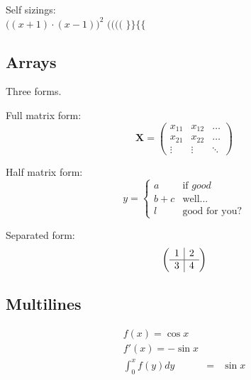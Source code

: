 \documentclass[12pt, oneside]{article}
\begin{document}
Self sizings: \\
$\Big( (x+1) \cdot (x-1) \Big)^{2}$ \qquad
$\big( \Big( \bigg( \Bigg($ \qquad
$\big\} \Big\} \bigg\{ \Bigg\{$ \qquad



\subsection{Arrays}
Three forms.

Full matrix form:
\begin{displaymath}
\mathbf{X} =
\left( \begin{array}{ccc} %
x_{11} & x_{12} & \ldots \\
x_{21} & x_{22} & \ldots \\
\vdots  & \vdots & \ddots
\end{array} \right) %
\end{displaymath}

Half matrix form:
\begin{displaymath}
y = \left\{ \begin{array}{cc} %
 a     & \textrm{if $good$} \\
 b+c & \textrm{well...}       \\
 l      & \textrm{good for you?}
\end{array} \right. %
\end{displaymath}

Separated form:
\begin{displaymath}
\left( \begin{array}{c | c}
1 & 2 \\
\hline
3 & 4 
\end{array} \right) 
\end{displaymath}



\subsection{Multilines}
\begin{eqnarray} 
f(x) = \cos x  \\
f'(x) = -\sin x \\
\int_{0}^{x} f(y)dy & = & \sin x 
\end{eqnarray}
\end{document}
